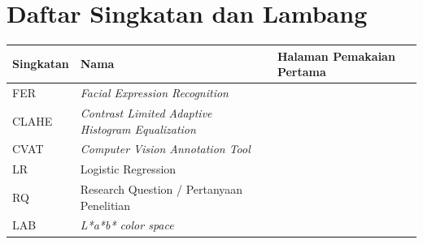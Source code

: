 \chapter*{Daftar Singkatan dan Lambang}

\begin{center}
\begin{tabular}{lp{7cm}p{3cm}}
\toprule
\textbf{Singkatan} & \textbf{Nama} & \textbf{Halaman Pemakaian Pertama} \\
\midrule
FER & \textit{Facial Expression Recognition} & \pageref{abbr:FER} \\
CLAHE & \textit{Contrast Limited Adaptive Histogram Equalization} & \pageref{abbr:CLAHE} \\
CVAT & \textit{Computer Vision Annotation Tool} & \pageref{abbr:CVAT} \\
LR & Logistic Regression & \pageref{abbr:LR} \\
RQ & Research Question / Pertanyaan Penelitian & \pageref{abbr:RQ} \\
LAB & \textit{L*a*b* color space} & \pageref{abbr:LAB} \\
\bottomrule
\end{tabular}
\end{center}
